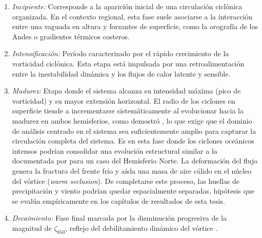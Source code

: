 \begin{enumerate}
    \item \textit{Incipiente:} Corresponde a la aparición inicial de una circulación ciclónica organizada.
    En el contexto regional, esta fase suele asociarse a la interacción entre una vaguada en altura y forzantes de superficie, como la orografía de los Andes o gradientes térmicos costeros.

    \item \textit{Intensificación:} Período caracterizado por el rápido crecimiento de la vorticidad ciclónica.
    Esta etapa está impulsada por una retroalimentación entre la inestabilidad dinámica y los flujos de calor latente y sensible.

    \item \textit{Madurez:} Etapa donde el sistema alcanza su intensidad máxima (pico de vorticidad) y su mayor extensión horizontal. El radio de los ciclones en superficie tiende a incrementarse sistemáticamente al evolucionar hacia la madurez en ambos hemisferios, como demostró \citet{simmonds2000size}, lo que exige que el dominio de análisis centrado en el sistema sea suficientemente amplio para capturar la circulación completa del sistema.
    Es en esta fase donde los ciclones oceánicos intensos podrían consolidar una evolución estructural similar a la documentada por \citet{shapiro1999bridge} para un caso del Hemisferio Norte. La deformación del flujo genera la fractura del frente frío y aísla una masa de aire cálido en el núcleo del vórtice (\textit{warm seclusion}).
    De completarse este proceso, las huellas de precipitación y viento podrían quedar espacialmente separadas, hipótesis que se evalúa empíricamente en los capítulos de resultados de esta tesis.

    \item \textit{Decaimiento:} Fase final marcada por la disminución progresiva de la magnitud de $\zeta_{850}$, reflejo del debilitamiento dinámico del vórtice \citep{coutodesouza2024thesis}.
\end{enumerate}


